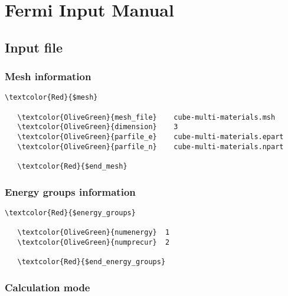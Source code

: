 \chapter*{Fermi Input Manual}





\section{Input file}

\subsection{Mesh information}

\begin{Verbatim}[frame=single,commandchars=\\\{\}]
   \textcolor{Red}{$mesh}

   \textcolor{OliveGreen}{mesh_file}    cube-multi-materials.msh
   \textcolor{OliveGreen}{dimension}    3
   \textcolor{OliveGreen}{parfile_e}    cube-multi-materials.epart
   \textcolor{OliveGreen}{parfile_n}    cube-multi-materials.npart

   \textcolor{Red}{$end_mesh}
\end{Verbatim}


\subsection{Energy groups information}

\begin{Verbatim}[frame=single,commandchars=\\\{\}]
   \textcolor{Red}{$energy_groups}

   \textcolor{OliveGreen}{numenergy}  1
   \textcolor{OliveGreen}{numprecur}  2

   \textcolor{Red}{$end_energy_groups}
\end{Verbatim}



\subsection{Calculation mode}

